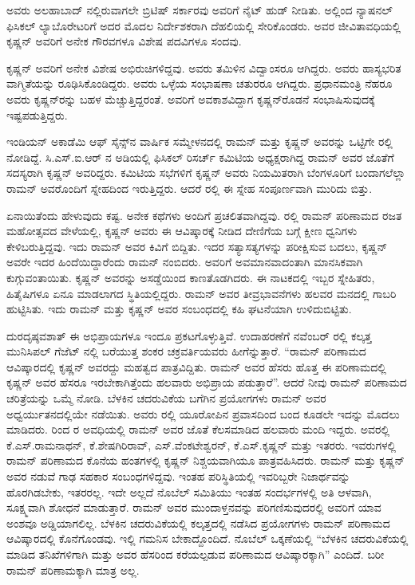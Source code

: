 ಅವರು ಅಲಹಾಬಾದ್ ನಲ್ಲಿರುವಾಗಲೇ ಬ್ರಿಟಿಷ್ ಸರ್ಕಾರವು ಅವರಿಗೆ ನೈಟ್ ಹುಡ್ ನೀಡಿತು. ಅಲ್ಲಿಂದ ನ್ಯಾಷನಲ್ ಫಿಸಿಕಲ್ ಲ್ಯಾಬೊರೇಟರಿಗೆ ಅದರ ಮೊದಲ ನಿರ್ದೇಶಕರಾಗಿ ದೆಹಲಿಯಲ್ಲಿ ಸೇರಿಕೊಂಡರು. ಅವರ ಜೀವಿತಾವಧಿಯಲ್ಲಿ ಕೃಷ್ಣನ್ ಅವರಿಗೆ ಅನೇಕ ಗೌರವಗಳೂ ವಿಶೇಷ ಪದವಿಗಳೂ ಸಂದವು.

ಕೃಷ್ಣನ್ ಅವರಿಗೆ ಅನೇಕ ವಿಶೇಷ ಅಭಿರುಚಿಗಳಿದ್ದವು. ಅವರು ತಮಿಳಿನ ವಿದ್ವಾಂಸರೂ ಆಗಿದ್ದರು. ಅವರು ಹಾಸ್ಯಭರಿತ ವಾಗ್ಮಿತೆಯನ್ನು ರೂಢಿಸಿಕೊಂಡಿದ್ದರು. ಅವರು ಒಳ್ಳೆಯ ಸಂಭಾಷಣಾ ಚತುರರೂ ಆಗಿದ್ದರು. ಪ್ರಧಾನಮಂತ್ರಿ ನೆಹರೂ ಅವರು ಕೃಷ್ಣನ್‍ರನ್ನು ಬಹಳ ಮೆಚ್ಚುತ್ತಿದ್ದರಂತೆ. ಅವರಿಗೆ ಅವಕಾಶವಿದ್ದಾಗ ಕೃಷ್ಣನ್‍ರೊಡನೆ ಸಂಭಾಷಿಸುವುದಕ್ಕೆ ಇಷ್ಟಪಡುತ್ತಿದ್ದರು.

ಇಂಡಿಯನ್ ಅಕಾಡೆಮಿ ಆಫ್ ಸೈನ್ಸ್‌ನ ವಾರ್ಷಿಕ ಸಮ್ಮೇಳನದಲ್ಲಿ ರಾಮನ್ ಮತ್ತು ಕೃಷ್ಣನ್ ಅವರನ್ನು ಒಟ್ಟಿಗೇ ರಲ್ಲಿ ನೋಡಿದ್ದೆ. ಸಿ.ಎಸ್.ಐ.ಆರ್ ನ ಅಡಿಯಲ್ಲಿ ಫಿಸಿಕಲ್ ರಿಸರ್ಚ್ ಕಮಿಟಿಯ ಅಧ್ಯಕ್ಷರಾಗಿದ್ದ ರಾಮನ್ ಅವರ ಜೊತೆಗೆ ಸದಸ್ಯರಾಗಿ ಕೃಷ್ಣನ್ ಅವರಿದ್ದರು. ಕಮಿಟಿಯ ಸಭೆಗಳಿಗೆ ಕೃಷ್ಣನ್ ಅವರು ನಿಯಮಿತರಾಗಿ ಬೆಂಗಳೂರಿಗೆ ಬಂದಾಗಲೆಲ್ಲಾ ರಾಮನ್ ಅವರೊಂದಿಗೆ ಸ್ನೇಹದಿಂದ ಇರುತ್ತಿದ್ದರು. ಆದರೆ ರಲ್ಲಿ ಈ ಸ್ನೇಹ ಸಂಪೂರ್ಣವಾಗಿ ಮುರಿದು ಬಿತ್ತು.

ಏನಾಯಿತೆಂದು ಹೇಳುವುದು ಕಷ್ಟ. ಅನೇಕ ಕಥೆಗಳು ಅಂದಿಗೆ ಪ್ರಚಲಿತವಾಗಿದ್ದವು. ರಲ್ಲಿ ರಾಮನ್ ಪರಿಣಾಮದ ರಜತ ಮಹೋತ್ಸವದ ವೇಳೆಯಲ್ಲಿ, ಕೃಷ್ಣನ್ ಅವರು ಈ ಆವಿಷ್ಕಾರಕ್ಕೆ ನೀಡಿದ ದೇಣಿಗೆಯ ಬಗ್ಗೆ ಕ್ಷೀಣ ಧ್ವನಿಗಳು ಕೇಳಿಬರುತ್ತಿದ್ದವು. ಇದು ರಾಮನ್ ಅವರ ಕಿವಿಗೆ ಬಿದ್ದಿತು. ಇದರ ಸತ್ಯಾಸತ್ಯಗಳನ್ನು ಪರೀಕ್ಷಿಸುವ ಬದಲು, ಕೃಷ್ಣನ್ ಅವರೇ ಇದರ ಹಿಂದೆಯಿದ್ದಾರೆಂದು ರಾಮನ್ ನಂಬಿದರು. ಅವರಿಗೆ ಅವಮಾನವಾದಂತಾಗಿ ಮಾನಸಿಕವಾಗಿ ಕುಗ್ಗುವಂತಾಯಿತು. ಕೃಷ್ಣನ್ ಅವರನ್ನು ಅಸಡ್ಡೆಯಿಂದ ಕಾಣತೊಡಗಿದರು. ಈ ನಾಟಕದಲ್ಲಿ ಇಬ್ಬರ ಸ್ನೇಹಿತರು, ಹಿತೈಷಿಗಳೂ ಏನೂ ಮಾಡಲಾಗದ ಸ್ಥಿತಿಯಲ್ಲಿದ್ದರು. ರಾಮನ್ ಅವರ ತೀವ್ರಭಾವನೆಗಳು ಹಲವರ ಮನದಲ್ಲಿ ಗಾಬರಿ ಹುಟ್ಟಿಸಿತು. ಇದು ರಾಮನ್ ಮತ್ತು ಕೃಷ್ಣನ್ ಅವರ ಸಂಬಂಧದಲ್ಲಿ ಕಹಿ ಘಟನೆಯಾಗಿ ಉಳಿದುಬಿಟ್ಟಿತು.

ದುರದೃಷ್ಠವಶಾತ್ ಈ ಅಭಿಪ್ರಾಯಗಳೂ ಇಂದೂ ಪ್ರಕಟಗೊಳ್ಳುತ್ತಿವೆ. ಉದಾಹರಣೆಗೆ ನವೆಂಬರ್ ರಲ್ಲಿ ಕಲ್ಕತ್ತ ಮುನಿಸಿಪಲ್ ಗೆಜೆಟ್ ನಲ್ಲಿ ಬರೆಯುತ್ತ ಶಂಕರ ಚಕ್ರವರ್ತಿಯವರು ಹೀಗೆನ್ನುತ್ತಾರೆ. \enginline{-} “ರಾಮನ್ ಪರಿಣಾಮದ ಆವಿಷ್ಕಾರದಲ್ಲಿ ಕೃಷ್ಣನ್ ಅವರದ್ದು ಮಹತ್ವದ ಪಾತ್ರವಿದ್ದಿತು. ರಾಮನ್ ಅವರ ಹೆಸರು ಹೊತ್ತ ಈ ಪರಿಣಾಮದಲ್ಲಿ ಕೃಷ್ಣನ್ ಅವರ ಹೆಸರೂ ಇರಬೇಕಾಗಿತ್ತೆಂದು ಹಲವಾರು ಅಭಿಪ್ರಾಯ ಪಡುತ್ತಾರೆ”. ಆದರೆ ನೀವು ರಾಮನ್ ಪರಿಣಾಮದ ಚರಿತ್ರೆಯನ್ನು ಒಮ್ಮೆ ನೋಡಿ. ಬೆಳಕಿನ ಚದರುವಿಕೆಯ ಬಗೆಗಿನ ಪ್ರಯೋಗಗಳು ರಾಮನ್ ಅವರ ಅಧ್ವರ್ಯುತನದಲ್ಲಿಯೇ ನಡೆಯಿತು. ಅವರು ರಲ್ಲಿ ಯೂರೋಪಿನ ಪ್ರವಾಸದಿಂದ ಬಂದ ಕೂಡಲೇ ಇದನ್ನು ಮೊದಲು ಮಾಡಿದರು.  ರಿಂದ  ರ ಅವಧಿಯಲ್ಲಿ ರಾಮನ್ ಅವರ ಜೊತೆ ಕೆಲಸಮಾಡಿದ ಹಲವಾರು ಮಂದಿ ಇದ್ದರು. ಅವರಲ್ಲಿ ಕೆ.ಎಸ್.ರಾಮನಾಥನ್, ಕೆ.ಶೇಷಗಿರಿರಾವ್, ಎಸ್.ವೆಂಕಟೇಶ್ವರನ್, ಕೆ.ಎಸ್.ಕೃಷ್ಣನ್ ಮತ್ತು ಇತರರು. ಇವರುಗಳಲ್ಲಿ ರಾಮನ್ ಪರಿಣಾಮದ ಕೊನೆಯ ಹಂತಗಳಲ್ಲಿ ಕೃಷ್ಣನ್ ನಿಶ್ಚಯವಾಗಿಯೂ ಪಾತ್ರವಹಿಸಿದರು. ರಾಮನ್ ಮತ್ತು ಕೃಷ್ಣನ್ ಅವರ ನಡುವೆ ಗಾಢ ಸಹಕಾರ ಸಂಬಂಧಗಳಿದ್ದವು. ಇಂತಹ ಪರಿಸ್ಥಿತಿಯಲ್ಲಿ ಇವರಿಬ್ಬರೇ ನಿಜಾರ್ಥವನ್ನು ಹೊರಗಿಡಬೇಕು, ಇತರರಲ್ಲ. ಇದೇ ಅಲ್ಲದೆ ನೊಬೆಲ್ ಸಮಿತಿಯು ಇಂತಹ ಸಂದರ್ಭಗಳಲ್ಲಿ ಅತಿ ಆಳವಾಗಿ, ಸೂಕ್ಷ್ಮವಾಗಿ ಶೋಧನೆ ಮಾಡುತ್ತಾರೆ. ರಾಮನ್ ಅವರ ಮುಂದಾಳ್ತನವನ್ನು ಪರಿಗಣಿಸುವುದರಲ್ಲಿ ಅವರಿಗೆ ಯಾವ ಅಂಶವೂ ಅಡ್ಡಿಯಾಗಲಿಲ್ಲ. ಬೆಳಕಿನ ಚದರುವಿಕೆಯಲ್ಲಿ ಕಲ್ಕತ್ತದಲ್ಲಿ ನಡೆಸಿದ ಪ್ರಯೋಗಗಳು ರಾಮನ್ ಪರಿಣಾಮದ ಆವಿಷ್ಕಾರದಲ್ಲಿ ಕೊನೆಗೊಂಡವು. ಇಲ್ಲಿ ಗಮನಿಸ ಬೇಕಾದ್ದೊಂದಿದೆ. ನೊಬೆಲ್ ಒಕ್ಕಣೆಯಲ್ಲಿ \enginline{-} “ಬೆಳಕಿನ ಚದರುವಿಕೆಯಲ್ಲಿ ಮಾಡಿದ ತನಿಖೆಗಳಿಗಾಗಿ ಮತ್ತು ಅವರ ಹೆಸರಿಂದ ಕರೆಯಲ್ಪಡುವ ಪರಿಣಾಮದ ಆವಿಷ್ಕಾರಕ್ಕಾಗಿ”\enginline{-} ಎಂದಿದೆ. ಬರೀ ರಾಮನ್ ಪರಿಣಾಮಕ್ಕಾಗಿ ಮಾತ್ರ ಅಲ್ಲ.

